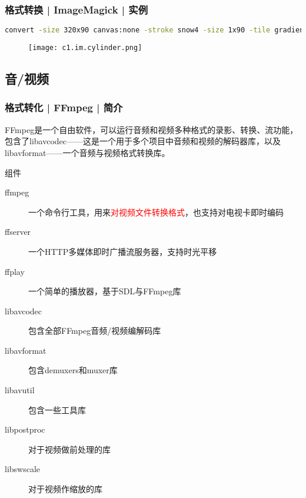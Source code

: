 \begin{frame}[fragile]
  \frametitle{格式转换 | ImageMagick | 实例}
\begin{lstlisting}[language=bash,basicstyle=\tiny\tt]
convert -size 320x90 canvas:none -stroke snow4 -size 1x90 -tile gradient:white-snow4 -draw 'roundrectangle 16, 5, 304, 85 20,40' +tile -fill snow -draw 'roundrectangle 264, 5, 304, 85  20,40' -tile gradient:chartreuse-green -draw 'roundrectangle 16, 5, 180, 85  20,40' -tile gradient:chartreuse1-chartreuse3 -draw 'roundrectangle 140, 5, 180, 85  20,40' +tile -fill none -draw 'roundrectangle 264, 5, 304, 85 20,40' -strokewidth 2 -draw 'roundrectangle 16, 5, 304, 85 20,40' \( +clone -background snow4 -shadow 80x3+3+3 \) +swap -background none -layers merge \( +size -font Helvetica -pointsize 90 -strokewidth 1 -fill red label:'50 %' -trim +repage \( +clone -background firebrick3 -shadow 80x3+3+3 \) +swap -background none -layers merge \) -insert 0 -gravity center -append -background white -gravity center -extent 320x200 cylinder_shaded.png
\end{lstlisting}
\begin{figure}
  \centering
  \texttt{[image: c1.im.cylinder.png]}
\end{figure}
\end{frame}

\subsection{音/视频}
\begin{frame}
  \frametitle{格式转化 | FFmpeg | 简介}
FFmpeg是一个自由软件，可以运行音频和视频多种格式的录影、转换、流功能，包含了libavcodec——这是一个用于多个项目中音频和视频的解码器库，以及libavformat——一个音频与视频格式转换库。
\begin{block}{组件}
  \begin{description}
    \item[ffmpeg]一个命令行工具，用来\textcolor{red}{对视频文件转换格式}，也支持对电视卡即时编码
    \item[ffserver]一个HTTP多媒体即时广播流服务器，支持时光平移
    \item[ffplay]一个简单的播放器，基于SDL与FFmpeg库
    \item[libavcodec]包含全部FFmpeg音频/视频编解码库
    \item[libavformat]包含demuxers和muxer库
    \item[libavutil]包含一些工具库
    \item[libpostproc]对于视频做前处理的库
    \item[libswscale]对于视频作缩放的库
  \end{description}
\end{block}
\end{frame}


